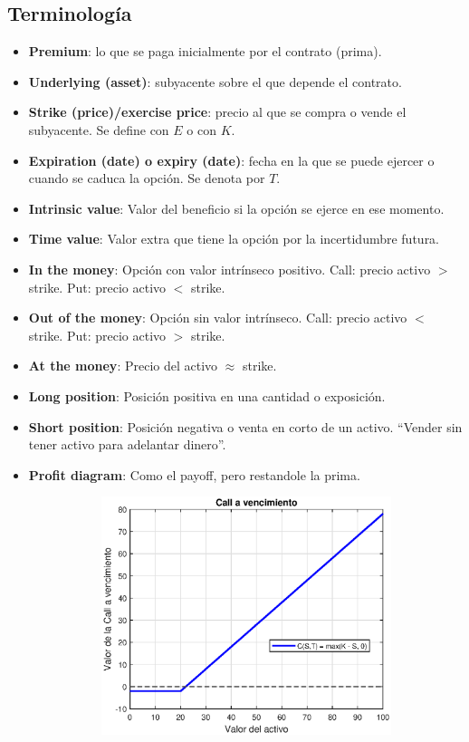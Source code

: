 \subsection{Terminología}
\begin{itemize}
    \item \textbf{Premium}: lo que se paga inicialmente por el contrato (prima).
    \item \textbf{Underlying (asset)}: subyacente sobre el que depende el contrato.
    \item \textbf{Strike (price)/exercise price}: precio al que se compra o vende el subyacente. Se define con $E$ o con $K$.
    \item \textbf{Expiration (date) o expiry (date)}: fecha en la que se puede ejercer o cuando se caduca la opción. Se denota por $T$.
    \item \textbf{Intrinsic value}: Valor del beneficio si la opción se ejerce en ese momento.
    \item \textbf{Time value}: Valor extra que tiene la opción por la incertidumbre futura.
    \item \textbf{In the money}: Opción con valor intrínseco positivo. Call: precio activo $>$ strike. Put: precio activo $<$ strike.
    \item \textbf{Out of the money}: Opción sin valor intrínseco. Call: precio activo $<$ strike. Put: precio activo $>$ strike.
    \item \textbf{At the money}: Precio del activo $\approx$ strike.
    \item \textbf{Long position}: Posición positiva en una cantidad o exposición.
    \item \textbf{Short position}: Posición negativa o venta en corto de un activo. ``Vender sin tener activo para adelantar dinero''.
    \item \textbf{Profit diagram}: Como el payoff, pero restandole la prima.
    \begin{figure}[H]
        \centering
        \begin{subfigure}[b]{0.45\linewidth}
            \includegraphics[width=\linewidth]{Imagenes/Parte1/2_Derivados/ProfitDiagCall.eps}

\end{subfigure}
\end{figure}
\end{itemize}
